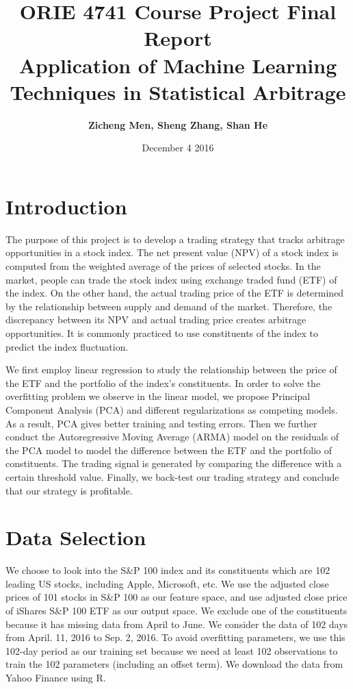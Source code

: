 \documentclass[letterpaper,12pt]{article}
\numberwithin{equation}{section}
\begin{document}
\allowdisplaybreaks


\title{\Large \bf
ORIE 4741 Course Project Final Report\\
Application of Machine Learning Techniques in Statistical Arbitrage
}
\author{{\bf Zicheng Men, Sheng Zhang, Shan He}}
\date{December 4 2016}
\maketitle

\section{Introduction}
The purpose of this project is to develop a trading strategy that tracks arbitrage opportunities in a stock index. The net present value (NPV) of a stock index is computed from the weighted average of the prices of selected stocks. In the market, people can trade the stock index using exchange traded fund (ETF) of the index. On the other hand, the actual trading price of the ETF is determined by the relationship between supply and demand of the market. Therefore, the discrepancy between its NPV and actual trading price creates arbitrage opportunities. It is commonly practiced to use constituents of the index to predict the index fluctuation. 

We first employ linear regression to study the relationship between the price of the ETF and the portfolio of the index's constituents. In order to solve the overfitting problem we observe in the linear model, we propose Principal Component Analysis (PCA) and different regularizations as competing models. As a result, PCA gives better training and testing errors. Then we further conduct the Autoregressive Moving Average (ARMA) model on the residuals of the PCA model to model the difference between the ETF and the portfolio of constituents. The trading signal is generated by comparing the difference with a certain threshold value. Finally, we back-test our trading strategy and conclude that our strategy is profitable.

\section{Data Selection}

We choose to look into the S\&P 100 index and its constituents which are 102 leading US stocks, including Apple, Microsoft, etc. We use the adjusted close prices of 101 stocks in S\&P 100 as our feature space, and use adjusted close price of iShares S\&P 100 ETF as our output space. We exclude one of the constituents because it has missing data from April to June. We consider the data of 102 days from April. 11, 2016 to Sep. 2, 2016. To avoid overfitting parameters, we use this 102-day period as our training set because we need at least 102 observations to train the 102 parameters (including an offset term). We download the data from Yahoo Finance using R.
\end{document}

